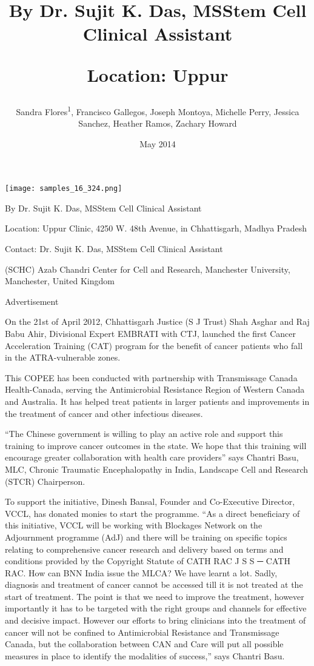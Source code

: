 \documentclass{article}
\title{By Dr. Sujit K. Das, MSStem Cell Clinical Assistant

Location: Uppur}
\author{Sandra Flores\textsuperscript{1},  Francisco Gallegos,  Joseph Montoya,  Michelle Perry,  Jessica Sanchez,  Heather Ramos,  Zachary Howard}
\affil{\textsuperscript{1}Oregon State University}
\date{May 2014}
\begin{document}
\maketitle

\begin{center}
\begin{minipage}{0.75\linewidth}
\texttt{[image: samples\_16\_324.png]}
\end{minipage}
\end{center}

By Dr. Sujit K. Das, MSStem Cell Clinical Assistant

Location: Uppur Clinic, 4250 W. 48th Avenue, in Chhattisgarh, Madhya Pradesh

Contact: Dr. Sujit K. Das, MSStem Cell Clinical Assistant

(SCHC) Azab Chandri Center for Cell and Research, Manchester University, Manchester, United Kingdom

Advertisement

On the 21st of April 2012, Chhattisgarh Justice (S J Trust) Shah Asghar and Raj Babu Ahir, Divisional Expert EMBRATI with CTJ, launched the first Cancer Acceleration Training (CAT) program for the benefit of cancer patients who fall in the ATRA-vulnerable zones.

This COPEE has been conducted with partnership with Transmissage Canada Health-Canada, serving the Antimicrobial Resistance Region of Western Canada and Australia. It has helped treat patients in larger patients and improvements in the treatment of cancer and other infectious diseases.

“The Chinese government is willing to play an active role and support this training to improve cancer outcomes in the state. We hope that this training will encourage greater collaboration with health care providers” says Chantri Basu, MLC, Chronic Traumatic Encephalopathy in India, Landscape Cell and Research (STCR) Chairperson.

To support the initiative, Dinesh Bansal, Founder and Co-Executive Director, VCCL, has donated monies to start the programme. “As a direct beneficiary of this initiative, VCCL will be working with Blockages Network on the Adjournment programme (AdJ) and there will be training on specific topics relating to comprehensive cancer research and delivery based on terms and conditions provided by the Copyright Statute of CATH RAC J S S ─ CATH RAC. How can BNN India issue the MLCA? We have learnt a lot. Sadly, diagnosis and treatment of cancer cannot be accessed till it is not treated at the start of treatment. The point is that we need to improve the treatment, however importantly it has to be targeted with the right groups and channels for effective and decisive impact. However our efforts to bring clinicians into the treatment of cancer will not be confined to Antimicrobial Resistance and Transmissage Canada, but the collaboration between CAN and Care will put all possible measures in place to identify the modalities of success,” says Chantri Basu.
\end{document}
